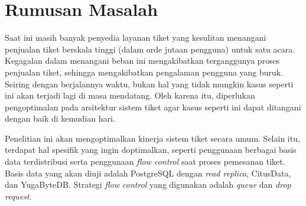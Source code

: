 \section{Rumusan Masalah}

Saat ini masih banyak penyedia layanan tiket yang kesulitan menangani penjualan tiket berskala tinggi (dalam orde jutaan pengguna) untuk satu acara. Kegagalan dalam menangani beban ini mengakibatkan terganggunya proses penjualan tiket, sehingga mengakibatkan pengalaman pengguna yang buruk. Seiring dengan berjalannya waktu, bukan hal yang tidak mungkin kasus seperti ini akan terjadi lagi di masa mendatang. Oleh karena itu, diperlukan pengoptimalan pada arsitektur sistem tiket agar kasus seperti ini dapat ditangani dengan baik di kemudian hari.

Penelitian ini akan mengoptimalkan kinerja sistem tiket secara umum. Selain itu, terdapat hal spesifik yang ingin doptimalkan, seperti penggunaan berbagai basis data terdistribusi serta penggunaan \textit{flow control} saat proses pemesanan tiket. Basis data yang akan diuji adalah PostgreSQL dengan \textit{read replica}, CitusData, dan YugaByteDB. Strategi \textit{flow control} yang digunakan adalah \textit{queue} dan \textit{drop request}.
